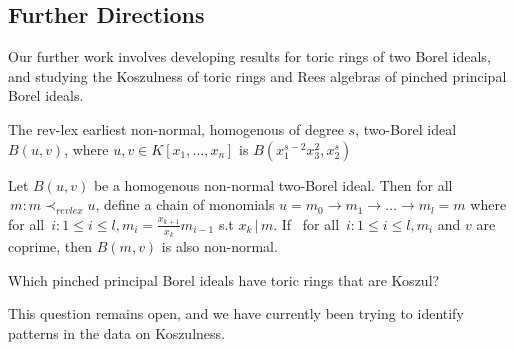 \documentclass[a0, landscape]{a0poster}
\begin{document}
\begin{multicols}{4}
	

\section*{\color{DarkSlateBlue}Further Directions}

Our further work involves developing results for toric rings of two Borel ideals, and studying the Koszulness of toric rings and Rees algebras of pinched principal Borel ideals. 

\begin{conjecture*}
	The rev-lex earliest non-normal, homogenous of degree $s$, two-Borel ideal $B(u,v)$, where $u, v \in K[x_1, \ldots, x_n]$ is $B(x^{s-2}_{1} x_{3}^{2}, x_{2}^s)$
\end{conjecture*} 

\begin{conjecture*}
	Let $B(u,v)$ be a homogenous non-normal two-Borel ideal. Then for all $ \, m: m\prec_{revlex}u$, define a chain of monomials $u=m_0 \rightarrow m_1 \rightarrow \ldots \rightarrow m_l = m$ where for all $ \, i: 1 \leq i \leq l, m_i = \frac{x_{k+1}}{x_k}m_{i-1}$ s.t $x_k \, | \, m$. If \, for all $ \, i: 1 \leq i \leq l, m_i$ and $v$ are coprime, then $B(m,v)$ is also non-normal.  
\end{conjecture*}

\begin{question*}
	Which pinched principal Borel ideals have toric rings that are Koszul? 
\end{question*}
This question remains open, and we have currently been trying to identify patterns in the data on Koszulness. 


\end{multicols}
\end{document}
